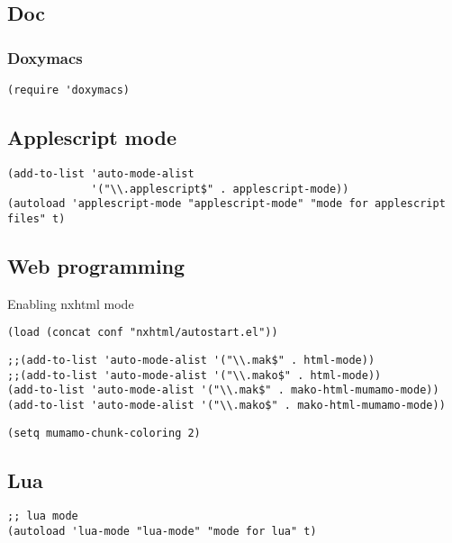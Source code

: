 \documentclass[11pt]{article}
\begin{document}
\subsection{Doc}
\label{sec-31.11}
\subsubsection{Doxymacs}
\label{sec-31.11.1}

\begin{verbatim}
(require 'doxymacs)
\end{verbatim}
\subsection{Applescript mode}
\label{sec-31.12}

\begin{verbatim}
(add-to-list 'auto-mode-alist
             '("\\.applescript$" . applescript-mode))
(autoload 'applescript-mode "applescript-mode" "mode for applescript files" t)
\end{verbatim}

   
\subsection{Web programming}
\label{sec-31.13}

  Enabling nxhtml mode
\begin{verbatim}
(load (concat conf "nxhtml/autostart.el"))
\end{verbatim}


\begin{verbatim}
;;(add-to-list 'auto-mode-alist '("\\.mak$" . html-mode))
;;(add-to-list 'auto-mode-alist '("\\.mako$" . html-mode))
(add-to-list 'auto-mode-alist '("\\.mak$" . mako-html-mumamo-mode))
(add-to-list 'auto-mode-alist '("\\.mako$" . mako-html-mumamo-mode))
\end{verbatim}


\begin{verbatim}
(setq mumamo-chunk-coloring 2)
\end{verbatim}
\subsection{Lua}
\label{sec-31.14}

\begin{verbatim}
;; lua mode
(autoload 'lua-mode "lua-mode" "mode for lua" t)
\end{verbatim}
\end{document}

